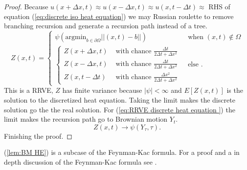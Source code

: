 \documentclass[a4paper,12pt]{article}
\begin{document}
\begin{proof}
    Because $u(x+\Delta x,t) \approx u(x-\Delta x,t) \approx u(x,t-\Delta t) \approx$
    RHS of equation (\ref{eq:discrete iso heat equation}) we may Russian roulette
    to remove branching recursion and generate a recursion path instead of a tree.
    \begin{equation} \label{eq:RRVE discrete heat equation }
        Z(x,t) =
        \begin{cases}
            \psi(\text{argmin}_{b \in \partial \Omega} ||(x,t) - b||)
             & \text{ when } (x,t) \notin \Omega \\
            \begin{cases}
                Z(x+\Delta x , t)  & \text{ with chance  } \frac{\Delta t}{ 2 \Delta t + \Delta x^{2}}     \\
                Z(x-\Delta x , t)  & \text{ with chance  } \frac{\Delta t}{ 2 \Delta t + \Delta x^{2}}     \\
                Z(x, t - \Delta t) & \text{ with chance  } \frac{\Delta x^{2}}{ 2 \Delta t + \Delta x^{2}}
            \end{cases}
             & \text{ else }.
        \end{cases}
    \end{equation}
    This is a RRVE, $Z$ has finite variance because $ |\psi|< \infty$
    and $E[Z(x,t)]$ is the solution to the discretized heat equation. Taking the limit
    makes the discrete solution go the the real solution.
    For (\ref{eq:RRVE discrete heat equation }) the limit
    makes the recursion path go to Brownian motion $Y_{t}$.
    \begin{equation}
        Z(x,t) \rightarrow \psi(Y_{\tau},\tau)  .
    \end{equation}
    Finishing the proof.
\end{proof}


\begin{related}
    (\ref{lem:BM HE}) is a subcase of the Feynman-Kac formula.
    For a proof and a in depth discussion of the Feynman-Kac formula
    see \cite{oksendal_stochastic_2003}. \\
\end{related}
\end{document}
